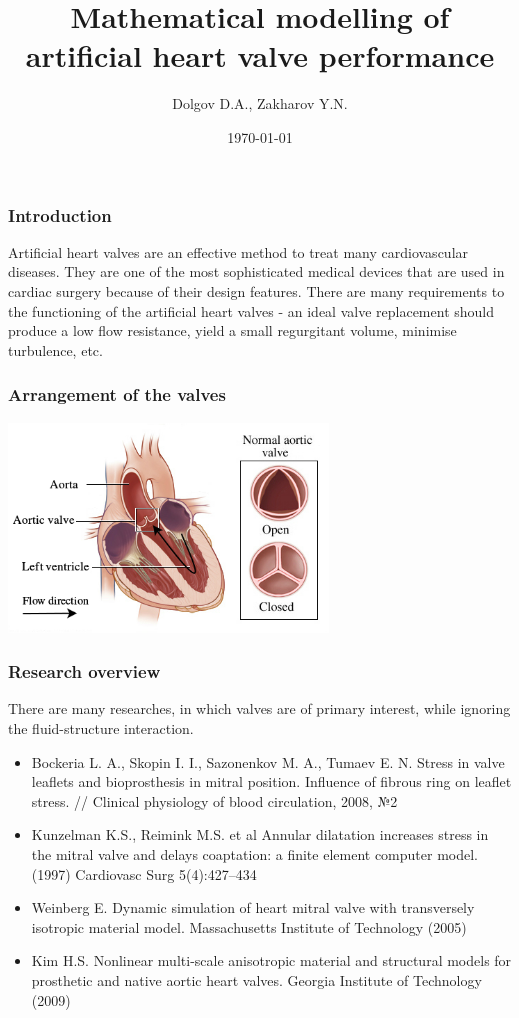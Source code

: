 \documentclass[14pt]{beamer}
\title[Mathematical modeling of artificial heart valve]{Mathematical modelling of artificial heart valve performance}
\date{\today}
\author[Dolgov D.A.]{Dolgov D.A., Zakharov Y.N.}
\institute{Kemerovo State University \\
    \vspace{0.7cm}
    \vspace{0.7cm}
}
\begin{document}
\maketitle

\begin{frame}
\frametitle{Introduction}
Artificial heart valves are an effective method to treat many cardiovascular diseases. They are one of the most sophisticated medical devices that are used in cardiac surgery because of their design features. There are many requirements to the functioning of the artificial heart valves - an ideal valve replacement should produce a low flow resistance, yield a small regurgitant volume, minimise turbulence, etc.
\end{frame}

\begin{frame}
\frametitle{Arrangement of the valves}
    \begin{center}
        \includegraphics[width=8.5cm]{aorta_scheme.png}
    \end{center}
\end{frame}

\begin{frame}
\frametitle{Research overview}
    There are many researches, in which valves are of primary interest, while ignoring the fluid-structure interaction.
    \par
    {\tiny
        \begin{itemize}
            \item[\MVRightarrow] Bockeria L. A., Skopin I. I., Sazonenkov M. A., Tumaev E. N. Stress in valve leaflets and bioprosthesis in mitral position. Influence of fibrous ring on leaflet stress. // Clinical physiology of blood circulation, 2008, №2
            \item[\MVRightarrow] Kunzelman K.S., Reimink M.S. et al  Annular dilatation increases stress in the mitral valve and delays coaptation: a finite element computer model. (1997) Cardiovasc Surg 5(4):427–434
            \item[\MVRightarrow] Weinberg E. Dynamic simulation of heart mitral valve with transversely isotropic material model. Massachusetts Institute of Technology (2005)
            \item[\MVRightarrow] Kim H.S. Nonlinear multi-scale anisotropic material and structural models for prosthetic and native aortic heart valves. Georgia Institute of Technology (2009)
        \end{itemize}
    }
\end{frame}
\end{document}

